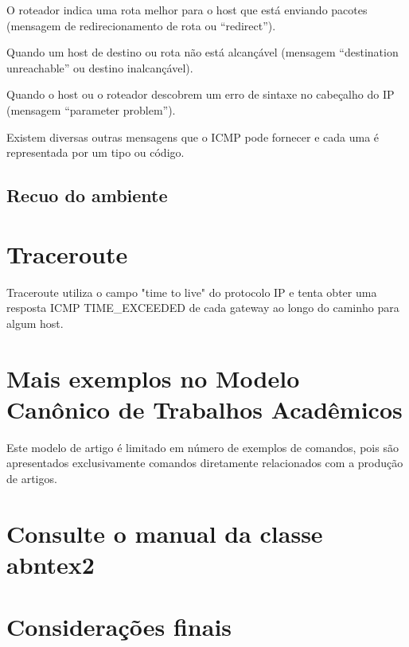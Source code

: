 \documentclass[
	article,			%
	11pt,				%
	oneside,			%
	a4paper,			%
	english,			%
	brazil,				%
	sumario=tradicional
	]{abntex2}
\begin{document}
O roteador indica uma rota melhor para o host que está enviando pacotes (mensagem de redirecionamento de rota ou “redirect”).

Quando um host de destino ou rota não está alcançável (mensagem “destination unreachable” ou destino inalcançável).

Quando o host ou o roteador descobrem um erro de sintaxe no cabeçalho do IP (mensagem “parameter problem”). 

Existem diversas outras mensagens que o ICMP pode fornecer e cada uma é representada por um tipo ou código.\cite{dltec}

\subsection{Recuo do ambiente }



\section{Traceroute}


Traceroute  utiliza o campo "time to live" do protocolo IP e tenta obter uma resposta ICMP TIME\_EXCEEDED de cada gateway ao longo do caminho para algum host.



\section{Mais exemplos no Modelo Canônico de Trabalhos Acadêmicos}

Este modelo de artigo é limitado em número de exemplos de comandos, pois são
apresentados exclusivamente comandos diretamente relacionados com a produção de
artigos.


\section{Consulte o manual da classe \textsf{abntex2}}


% 

\section*{Considerações finais}

\lipsum[1]

\begin{citacao}
\lipsum[2]
\end{citacao}

\lipsum[3]


\end{document}
